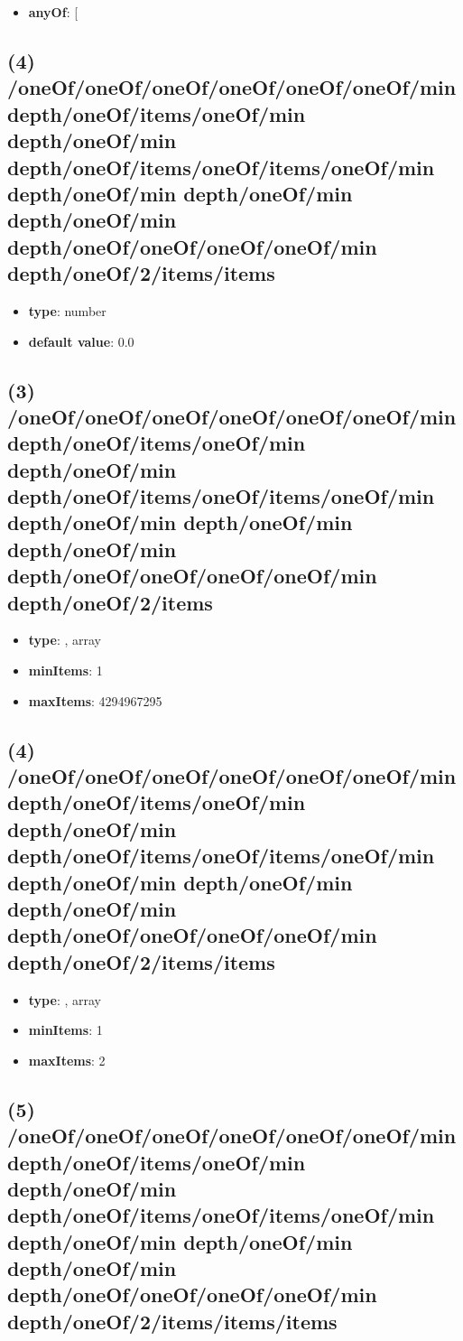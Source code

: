 \begin{itemize}[leftmargin=4em]\item {\bf anyOf}: [\end{itemize}\subsection{(4) /oneOf/oneOf/oneOf/oneOf/oneOf/oneOf/min depth/oneOf/items/oneOf/min depth/oneOf/min depth/oneOf/items/oneOf/items/oneOf/min depth/oneOf/min depth/oneOf/min depth/oneOf/min depth/oneOf/oneOf/oneOf/oneOf/min depth/oneOf/2/items/items}
\begin{itemize}[leftmargin=4em]\item {\bf type}: number\item {\bf default value}: 0.0
\end{itemize}\subsection{(3) /oneOf/oneOf/oneOf/oneOf/oneOf/oneOf/min depth/oneOf/items/oneOf/min depth/oneOf/min depth/oneOf/items/oneOf/items/oneOf/min depth/oneOf/min depth/oneOf/min depth/oneOf/min depth/oneOf/oneOf/oneOf/oneOf/min depth/oneOf/2/items}
\begin{itemize}[leftmargin=3em]\item {\bf type}: , array\item {\bf minItems}: 1
\item {\bf maxItems}: 4294967295
\end{itemize}\subsection{(4) /oneOf/oneOf/oneOf/oneOf/oneOf/oneOf/min depth/oneOf/items/oneOf/min depth/oneOf/min depth/oneOf/items/oneOf/items/oneOf/min depth/oneOf/min depth/oneOf/min depth/oneOf/min depth/oneOf/oneOf/oneOf/oneOf/min depth/oneOf/2/items/items}
\begin{itemize}[leftmargin=4em]\item {\bf type}: , array\item {\bf minItems}: 1
\item {\bf maxItems}: 2
\end{itemize}\subsection{(5) /oneOf/oneOf/oneOf/oneOf/oneOf/oneOf/min depth/oneOf/items/oneOf/min depth/oneOf/min depth/oneOf/items/oneOf/items/oneOf/min depth/oneOf/min depth/oneOf/min depth/oneOf/min depth/oneOf/oneOf/oneOf/oneOf/min depth/oneOf/2/items/items/items}
